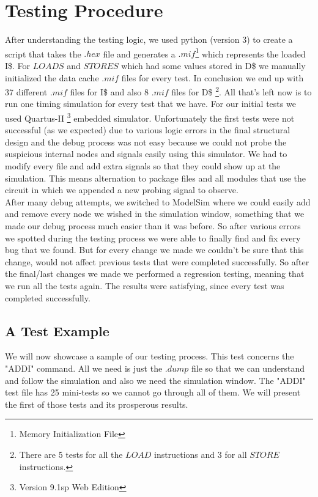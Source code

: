 \section{Testing Procedure}
\label{Sec4.2:TESTING}
After understanding the testing logic, we used python (version 3) to create a script that takes the $.hex$ file and generates a $.mif$\footnote{Memory Initialization File} which represents the loaded I\$. For $LOADS$ and $STORES$ which had some values stored in D\$ we manually initialized the data cache $.mif$ files for every test. In conclusion we end up with 37 different $.mif$ files for I\$ and also 8 $.mif$ files for D\$ \footnote{There are 5 tests for all the $LOAD$ instructions and 3 for all $STORE$ instructions.}. All that's left now is to run one timing simulation for every test that we have. For our initial tests we used Quartus-II \footnote{Version 9.1sp Web Edition} embedded simulator. Unfortunately the first tests were not successful (as we expected) due to various logic errors in the final structural design and the debug process was not easy because we could not probe the suspicious internal nodes and signals easily using this simulator. We had to modify every file and add extra signals so that they could show up at the simulation. This means alternation to package files and all modules that use the circuit in which we appended a new probing signal to observe. \\

After many debug attempts, we switched to ModelSim where we could easily add and remove every node we wished in the simulation window, something that we made our debug process much easier than it was before. So after various errors we spotted during the testing process we were able to finally find and fix every bug that we found. But for every change we made we couldn't be sure that this change, would not affect previous tests that were completed successfully. So after the final/last changes we made we performed a regression testing, meaning that we run all the tests again. The results were satisfying, since every test was completed successfully. 
\vspace{-4mm}
\subsection{A Test Example}
\label{SubSec4.2.1:EXAMPLE}

We will now showcase a sample of our testing process. This test concerns the "ADDI" command. All we need is just the $.dump$ file so that we can understand and follow the simulation and also we need the simulation window. The "ADDI" test file has 25 mini-tests so we cannot go through all of them. We will present the first of those tests and its prosperous results. 

